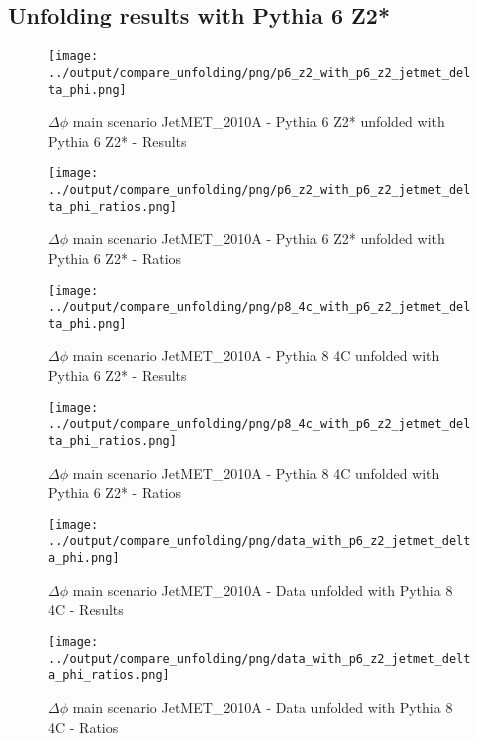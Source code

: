 \documentclass[11pt]{book}
\begin{document}
\clearpage
\subsection{Unfolding results with Pythia 6 Z2*}

\begin{figure}[ht]
\centering
\texttt{[image: ../output/compare\_unfolding/png/p6\_z2\_with\_p6\_z2\_jetmet\_delta\_phi.png]}
\caption{$\Delta\phi$ main scenario JetMET\_2010A - Pythia 6 Z2* unfolded with Pythia 6 Z2* - Results}
\label{p6_p6_jetmet_delta_phi_a}
\end{figure}

\begin{figure}[ht]
\centering
\texttt{[image: ../output/compare\_unfolding/png/p6\_z2\_with\_p6\_z2\_jetmet\_delta\_phi\_ratios.png]}
\caption{$\Delta\phi$ main scenario JetMET\_2010A - Pythia 6 Z2* unfolded with Pythia 6 Z2* - Ratios}
\label{p6_p6_jetmet_delta_phi_b}
\end{figure}

\begin{figure}[ht]
\centering
\texttt{[image: ../output/compare\_unfolding/png/p8\_4c\_with\_p6\_z2\_jetmet\_delta\_phi.png]}
\caption{$\Delta\phi$ main scenario JetMET\_2010A - Pythia 8 4C unfolded with Pythia 6 Z2* - Results}
\label{p8_p6_jetmet_delta_phi_a}
\end{figure}

\begin{figure}[ht]
\centering
\texttt{[image: ../output/compare\_unfolding/png/p8\_4c\_with\_p6\_z2\_jetmet\_delta\_phi\_ratios.png]}
\caption{$\Delta\phi$ main scenario JetMET\_2010A - Pythia 8 4C unfolded with Pythia 6 Z2* - Ratios}
\label{p8_p6_jetmet_delta_phi_b}
\end{figure}

\begin{figure}[ht]
\centering
\texttt{[image: ../output/compare\_unfolding/png/data\_with\_p6\_z2\_jetmet\_delta\_phi.png]}
\caption{$\Delta\phi$ main scenario JetMET\_2010A - Data unfolded with Pythia 8 4C - Results}
\label{data_p6_jetmet_delta_phi_a}
\end{figure}

\begin{figure}[ht]
\centering
\texttt{[image: ../output/compare\_unfolding/png/data\_with\_p6\_z2\_jetmet\_delta\_phi\_ratios.png]}
\caption{$\Delta\phi$ main scenario JetMET\_2010A - Data unfolded with Pythia 8 4C - Ratios}
\label{data_p6_jetmet_delta_phi_b}
\end{figure}
\end{document}
